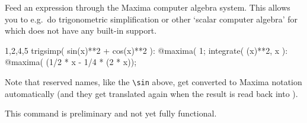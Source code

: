 
Feed an expression through the Maxima computer algebra system. This
allows you to e.g.~do trigonometric simplification or other `scalar
computer algebra' for which \cdb does not have any built-in support.
\begin{screen}{1,2,4,5}
trigsimp( sin(x)**2 + cos(x)**2 ):
@maxima(%
1;
integrate( \sin(x)**2, x ):
@maxima(%
(1/2 * x - 1/4 * \sin(2 * x));
\end{screen}
Note that reserved names, like the \verb|\sin| above, get converted to
Maxima notation automatically (and they get translated again when
the result is read back into \cdb).

This command is preliminary and not yet fully functional.


